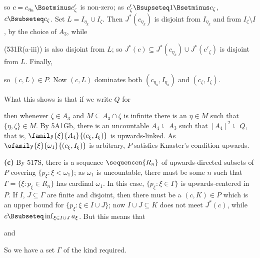 {

\noindent so
$c=c_{\eta_k}\Bsetminus c'_{\zeta}$ is non-zero;  as
$c'_{\zeta}\Bsupseteq 1\Bsetminus c_{\zeta}$, $c\Bsubseteq c_{\zeta}$.
Set $L=I_{\eta_k}\cup I_{\zeta}$.
Then $J^*(c_{\eta_k})$ is disjoint from $I_{\eta_k}$ and from
$I_{\zeta}\setminus I$, by the choice of $A_3$, while


\noindent (531R(a-iii)) is also disjoint from $L$;  so
$J^*(c)\subseteq J^*(c_{\eta_k})\cup J^*(c'_{\zeta})$ is disjoint from
$L$.   Finally,


\noindent so $(c,L)\in P$.   Now $(c,L)$ dominates both
$(c_{\eta_k},I_{\eta_k})$ and $(c_{\zeta},I_{\zeta})$.

What this shows is that if we write $Q$ for


\noindent then whenever $\zeta\in A_3$ and $M\subseteq A_3\cap\zeta$ is
infinite there is an $\eta\in M$ such that $\{\eta,\zeta\}\in M$.   By
5A1Gb, there is an uncountable
$A_4\subseteq A_3$ such that $[A_4]^2\subseteq Q$, that is,
$\family{\xi}{A_4}{(c_{\xi},I_{\xi})}$ is upwards-linked.   As
$\ofamily{\xi}{\omega_1}{(c_{\xi},I_{\xi})}$ is arbitrary, $P$ satisfies
Knaster's condition upwards.\ \Qed

\medskip

{\bf (c)} By 517S, there is a sequence $\sequencen{R_n}$ of
upwards-directed subsets of $P$ covering $\{p_{\xi}:\xi<\omega_1\}$;  as $\omega_1$
is uncountable, there must be some $n$ such that
$\Gamma=\{\xi:p_{\xi}\in R_n\}$ has cardinal $\omega_1$.   In this case,
$\{p_{\xi}:\xi\in\Gamma\}$ is upwards-centered in $P$.   If $I$,
$J\subseteq\Gamma$ are finite and disjoint, then there must be a
$(c,K)\in P$ which
is an upper bound for $\{p_{\xi}:\xi\in I\cup J\}$;  now
$I\cup J\subseteq K$ does not meet $J^*(c)$, while
$c\Bsubseteq\inf_{\xi\in I\cup J}a_{\xi}$.   But this means that


\noindent and


\noindent So we have a set $\Gamma$ of the kind required.
}%

